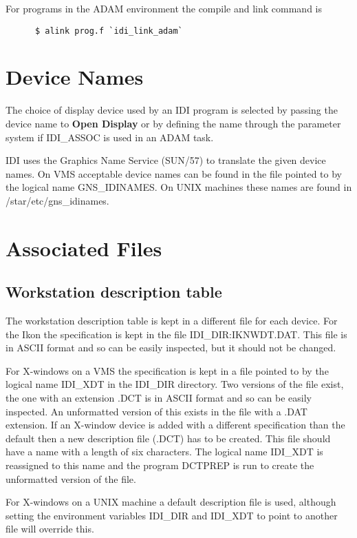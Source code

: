For programs in the ADAM environment the compile and link command is
\begin{small}
\begin{verbatim}
      $ alink prog.f `idi_link_adam`
\end{verbatim}
\end{small}

\section{Device Names}

The choice of display device used by an IDI program is selected by
passing the device name to {\bf Open Display} or by defining the name
through the parameter system if IDI\_ASSOC is used in an ADAM task.

IDI uses the Graphics Name Service (SUN/57) to translate the given
device names. On VMS acceptable device names can be found in the file
pointed to by the logical name GNS\_IDINAMES. On UNIX machines these
names are found in /star/etc/gns\_idinames.


\section{Associated Files}

\subsection{Workstation description table}

The workstation description table is kept in a different file for each
device. For the Ikon the specification is kept in the file
IDI\_DIR:IKNWDT.DAT. This file is in ASCII
format and so can be easily inspected, but it should not be changed.

For X-windows on a VMS the specification is kept in a file
pointed to by the logical name IDI\_XDT in the IDI\_DIR directory.
Two versions of the file exist, the one with an extension .DCT is
in ASCII format and so can be easily inspected. An unformatted
version of this exists in the file with a .DAT extension.
If an X-window device is added with a different specification
than the default then a new description file (.DCT) has to be created.
This file should have a name with a length of six characters. The
logical name IDI\_XDT is reassigned to this name and the program
DCTPREP is run to create the unformatted version of the file.

For X-windows on a UNIX machine a default description file is used,
although setting the environment variables IDI\_DIR and IDI\_XDT to point
to another file will override this.


